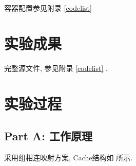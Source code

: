 容器配置参见附录 \ref{codelist} 

\clearpage
\section{实验成果}

完整源文件, 参见附录 \ref{codelist} .

\section{实验过程}

\subsection{Part A: 工作原理}

采用组相连映射方案, Cache结构如 所示. 

